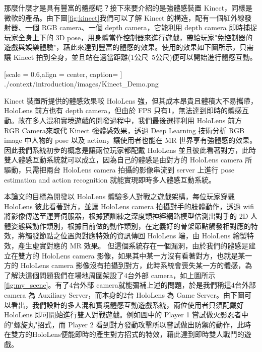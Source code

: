 \newpage

那麼什麼才是具有豐富的體感呢？接下來要介紹的是強體感裝置 Kinect，同樣是微軟的產品。由下圖\ref{fig:kinect}我們可以了解 Kinect 的構造，配有一個紅外線發射器、一個 RGB camera、一個 depth camera，它能利用 depth camera 即時捕捉玩家全身上下的 3D pose，用身體當作控制器來進行遊戲，帶給玩家"免控制器的遊戲與娛樂體驗"，藉此來達到豐富的體感的效果。使用的效果如下圖所示，只需讓 Kinect 拍到全身，並且站在適當距離(1公尺~5公尺)便可以開始進行體感互動。

%
{   
	[scale = 0.6,align = center, caption={ } ]
	{./context/introduction/images/Kinect_Demo.png} 
}%

\newpage

Kinect 裝置所提供的體感效果較 HoloLens 強，但其成本昂貴且體積大不易攜帶，HoloLens 前方也有 depth camera，但由於 FPS 只有1，無法達到即時的體感互動。故在多人混和實境遊戲的開發過程中，我們最後選擇利用 HoloLens 前方 RGB Camera來取代 Kinect 強體感效果，透過 Deep Learning 技術分析 RGB image 中人物的 pose 以及 action，讓使用者也能在 MR 世界享有強體感的效果。因此我們系統初步的概念是讓兩位玩家都配戴 HoloLens 並且彼此看著對方，此時雙人體感互動系統就可以成立，因為自己的體感是由對方的 HoloLens camera 所驅動，只需把兩台 HoloLens camera 拍攝的影像串流到 server 上進行 pose estimation and action recognition 就能實現即時多人體感互動系統。


本論文的目標為開發以 HoloLens 體驗多人對戰之遊戲架構，每位玩家穿戴 HoloLens 彼此看著對方，並讓 HoloLens camera 拍攝對手的肢體動作，透過 wifi 將影像傳送至運算伺服器，根據預訓練之深度類神經網路模型估測出對手的 2D 人體姿態與動作類別，根據目前做的動作類別，在定義好的骨架節點觸發相對應的特效，將觸發節點之位置與對應特效的資訊傳回 HoloLens 端，由 HoloLens 繪製特效，產生虛實對應的 MR 效果。
但這個系統存在一個漏洞，由於我們的體感是建立在雙方的 HoloLens camera 影像，如果其中某一方沒有看著對方，也就是某一方的 HoloLens camera 影像沒有拍攝到對方，此時系統會喪失某一方的體感，為了解決這個問題我們在場地周圍架設了4台外部 camera，如上圖所示\ref{fig:my_scene}。有了4台外部 camera就能彌補上述的問題，於是我們稱這4台外部 camera 為 Auxiliary Server，而本身的2台 HoloLens 為 Game Server。由下圖可以看出，我們設計的多人混和實境體感互動遊戲系統，兩位使用者只須配戴好 HoloLens 即可開始進行雙人對戰遊戲。例如圖中的 Player 1 嘗試做火影忍者中的"螺旋丸"招式，而 Player 2 看到對方發動攻擊所以嘗試做出防禦的動作，此時在雙方的HoloLens便能即時的產生對方招式的特效，藉此達到即時雙人戰鬥的遊戲。

